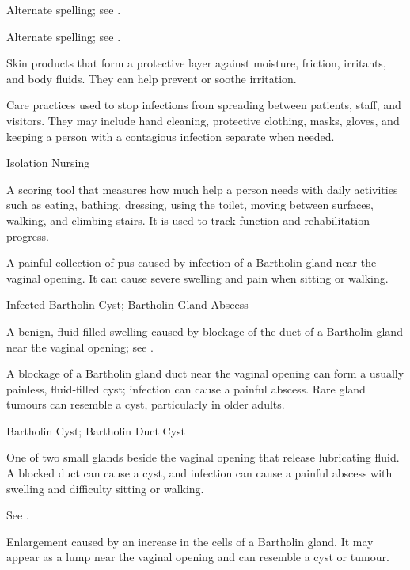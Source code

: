  Alternate spelling; see .

 Alternate spelling; see .

 Skin products that form a protective layer against moisture, friction, irritants, and body fluids. They can help prevent or soothe irritation.

 Care practices used to stop infections from spreading between patients, staff, and visitors. They may include hand cleaning, protective clothing, masks, gloves, and keeping a person with a contagious infection separate when needed.

\synonyms
Isolation Nursing

 A scoring tool that measures how much help a person needs with daily activities such as eating, bathing, dressing, using the toilet, moving between surfaces, walking, and climbing stairs. It is used to track function and rehabilitation progress.

 A painful collection of pus caused by infection
of a Bartholin gland near the vaginal opening. It can cause severe swelling
and pain when sitting or walking.

\synonyms
Infected Bartholin Cyst; Bartholin Gland Abscess

 A benign, fluid-filled swelling caused by blockage of the duct of a Bartholin gland near the vaginal opening; see .

 A blockage of a Bartholin gland duct near the vaginal opening can form a usually painless, fluid-filled cyst; infection can cause a painful abscess. Rare gland tumours can resemble a cyst, particularly in older adults.

\synonyms
Bartholin Cyst; Bartholin Duct Cyst

 One of two small glands beside the vaginal opening that release lubricating fluid. A blocked duct can cause a cyst, and infection can cause a painful abscess with swelling and difficulty sitting or walking.

 See .


 Enlargement caused by an increase in the cells of a Bartholin gland. It may appear as a lump near the vaginal opening and can resemble a cyst or tumour.

